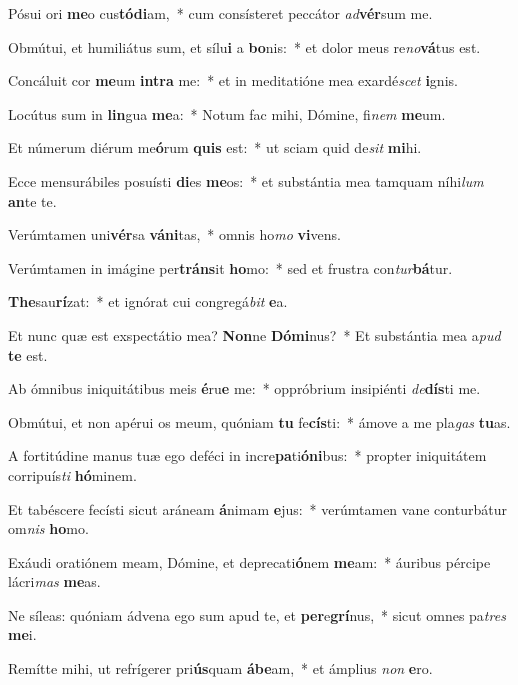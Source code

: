 \item Pósui ori \textbf{me}o cus\textbf{tó}\textbf{di}am,~* cum consísteret peccátor \textit{ad}\textbf{vér}sum me.
\item Obmútui, et humiliátus sum, et sílu\textbf{i} a \textbf{bo}nis:~* et dolor meus re\textit{no}\textbf{vá}tus est.
\item Concáluit cor \textbf{me}um \textbf{in}\textbf{tra} me:~* et in meditatióne mea exardé\textit{scet} \textbf{i}gnis.
\item Locútus sum in \textbf{lin}gua \textbf{me}a:~* Notum fac mihi, Dómine, fi\textit{nem} \textbf{me}um.
\item Et númerum diérum me\textbf{ó}rum \textbf{quis} est:~* ut sciam quid de\textit{sit} \textbf{mi}hi.
\item Ecce mensurábiles posuísti \textbf{di}es \textbf{me}os:~* et substántia mea tamquam níhi\textit{lum} \textbf{an}te te.
\item Verúmtamen uni\textbf{vér}sa \textbf{vá}\textbf{ni}tas,~* omnis ho\textit{mo} \textbf{vi}vens.
\item Verúmtamen in imágine per\textbf{tráns}it \textbf{ho}mo:~* sed et frustra con\textit{tur}\textbf{bá}tur.
\item \textbf{The}sau\textbf{rí}zat:~* et ignórat cui congregá\textit{bit} \textbf{e}a.
\item Et nunc quæ est exspectátio mea? \textbf{Non}ne \textbf{Dó}\textbf{mi}nus?~* Et substántia mea a\textit{pud} \textbf{te} est.
\item Ab ómnibus iniquitátibus meis \textbf{é}ru\textbf{e} me:~* oppróbrium insipiénti \textit{de}\textbf{dís}ti me.
\item Obmútui, et non apérui os meum, quóniam \textbf{tu} fe\textbf{cís}ti:~* ámove a me pla\textit{gas} \textbf{tu}as.
\item A fortitúdine manus tuæ ego deféci in incre\textbf{pa}ti\textbf{ó}\textbf{ni}bus:~* propter iniquitátem corripuís\textit{ti} \textbf{hó}minem.
\item Et tabéscere fecísti sicut aráneam \textbf{á}nimam \textbf{e}jus:~* verúmtamen vane conturbátur om\textit{nis} \textbf{ho}mo.
\item Exáudi oratiónem meam, Dómine, et deprecati\textbf{ó}nem \textbf{me}am:~* áuribus pércipe lácri\textit{mas} \textbf{me}as.
\item Ne síleas: quóniam ádvena ego sum apud te, et \textbf{per}e\textbf{grí}nus,~* sicut omnes pa\textit{tres} \textbf{me}i.
\item Remítte mihi, ut refrígerer pri\textbf{ús}quam \textbf{á}\textbf{be}am,~* et ámplius \textit{non} \textbf{e}ro.
